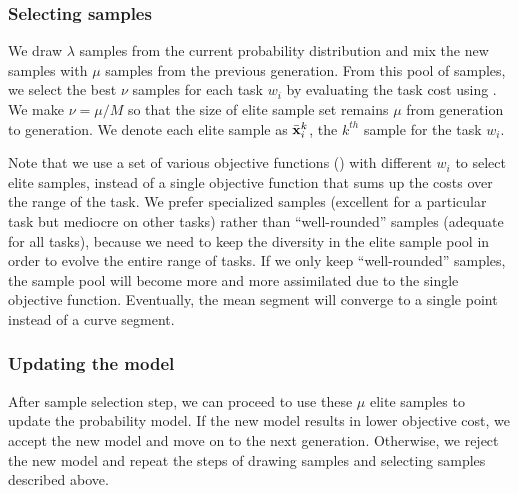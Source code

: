 \subsubsection{Selecting samples}
We draw $\lambda$ samples from the current probability distribution
and mix the new samples with $\mu$ samples from the previous generation. From this
pool of samples, we select the best $\nu$ samples for each task $w_i$
by evaluating the task cost using . We make $\nu =
\mu / M$ so that the size of elite sample set remains $\mu$ from
generation to generation. We denote each elite sample as
$\bar{\mathbf{x}}_i^k$, the $k^{th}$ sample for the task $w_i$.

Note that we use a set of various objective functions
() with different $w_i$ to select elite samples,
instead of a single objective function that sums up the costs over the
range of the task. We prefer specialized samples (excellent for
a particular task but mediocre on other tasks) rather than
``well-rounded'' samples (adequate for all tasks), because we need to
keep the diversity in the elite sample pool in order to evolve the
entire range of tasks. If we only keep ``well-rounded'' samples, the
sample pool will become more and more assimilated due to the single
objective function. Eventually, the mean segment will converge to a
single point instead of a curve segment.


\subsubsection{Updating the model}
  After sample selection step, we can proceed to use these $\mu$ elite
  samples to update the probability model. If the new model results in
  lower objective cost, we accept the new model and move on to the
  next generation. Otherwise, we reject the new model and repeat the steps
  of drawing samples and selecting samples described above.


